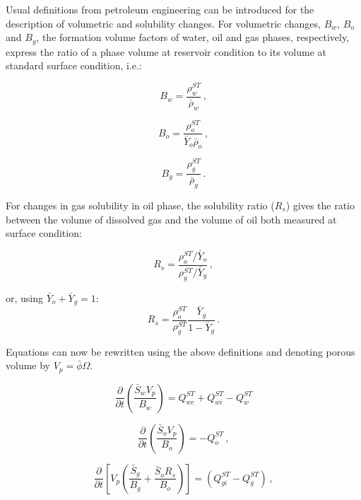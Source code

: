 \documentclass[final,authoryear,5p,twocolumn,10pt]{elsarticle}
\begin{document}
Usual definitions from petroleum engineering can be introduced for the description of volumetric and solubility changes. For volumetric changes, $B_w$, $B_o$ and $B_g$, the formation volume factors of water, oil and gas phases, respectively, express the ratio of a phase volume at reservoir condition to its volume at standard surface condition, i.e.:

\begin{equation}\label{eq: Bw}
B_w = \frac{\rho_w^{ST}}{\bar{\rho}_w} \, ,
\end{equation}

\begin{equation}\label{eq: Bo}
B_o = \frac{\rho_o^{ST}}{\bar{Y}_o \bar{\rho}_o} \, ,
\end{equation}

\begin{equation}\label{eq: Bg}
B_g = \frac{\rho_g^{ST}}{\bar{\rho}_g} \, .
\end{equation}

For changes in gas solubility in oil phase, the solubility ratio ($R_s$) gives the ratio between the volume of dissolved gas and the volume of oil both measured at surface condition:

\begin{equation}
R_s = \frac{\rho_o^{ST} / \bar{Y}_o}{\rho_g^{ST} / \bar{Y}_g} \, ,
\end{equation}

or, using $\bar{Y}_o + \bar{Y}_g = 1$:
\begin{equation}
R_s = \frac{\rho_o^{ST}}{\rho_g^{ST}}\frac{\bar{Y}_g}{1-\bar{Y}_g} \, .
\end{equation}

Equations can now be rewritten using the above definitions and denoting porous volume by $V_p = \bar{\phi}\Omega$.

\begin{equation}\label{eq: Sw4}
\frac{\partial}{\partial t} \left(\frac{\bar{S}_w V_p}{B_w} \right) = Q_{we}^{ST} + Q_{wi}^{ST}-Q_w^{ST}
\end{equation}

\begin{equation}\label{eq: So4}
\frac{\partial}{\partial t} \left(\frac{\bar{S}_o V_p}{B_o} \right) = - Q_o^{ST} \, ,
\end{equation}

\begin{equation}\label{eq: Sg4}
\frac{\partial}{\partial t} \left[ V_p \left(\frac{\bar{S}_g}{B_g} + \frac{\bar{S}_o R_s}{B_o} \right) \right] = \left( Q_{gi}^{ST}-Q_g^{ST} \right) \, ,
\end{equation}
\end{document}
